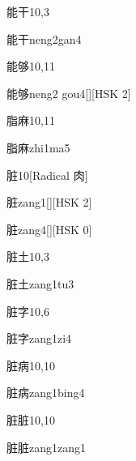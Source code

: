 \begin{entry}{能干}{10,3}
  \begin{phonetics}{能干}{neng2gan4}
  \end{phonetics}
\end{entry}

\begin{entry}{能够}{10,11}
  \begin{phonetics}{能够}{neng2 gou4}[][HSK 2]
  \end{phonetics}
\end{entry}

\begin{entry}{脂麻}{10,11}
  \begin{phonetics}{脂麻}{zhi1ma5}
  \end{phonetics}
\end{entry}

\begin{entry}{脏}{10}[Radical 肉]
  \begin{phonetics}{脏}{zang1}[][HSK 2]
  \end{phonetics}
  \begin{phonetics}{脏}{zang4}[][HSK 0]
  \end{phonetics}
\end{entry}

\begin{entry}{脏土}{10,3}
  \begin{phonetics}{脏土}{zang1tu3}
  \end{phonetics}
\end{entry}

\begin{entry}{脏字}{10,6}
  \begin{phonetics}{脏字}{zang1zi4}
  \end{phonetics}
\end{entry}

\begin{entry}{脏病}{10,10}
  \begin{phonetics}{脏病}{zang1bing4}
  \end{phonetics}
\end{entry}

\begin{entry}{脏脏}{10,10}
  \begin{phonetics}{脏脏}{zang1zang1}
  \end{phonetics}
\end{entry}

